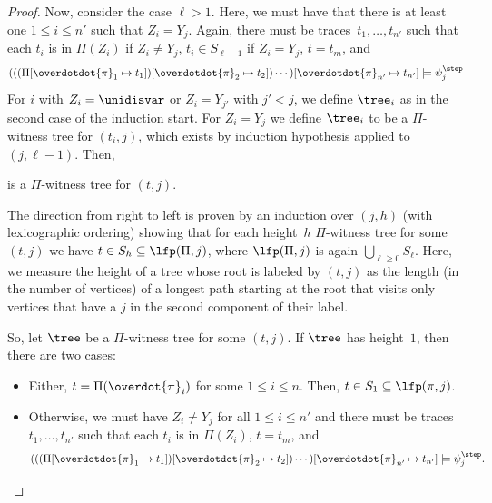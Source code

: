 \begin{proof}
Now, consider the case $\ell > 1$. Here, we must have that there is at least one $1 \le i \le n'$ such that $Z_i = Y_j$. Again, there must be traces~$t_1, \ldots, t_{n'}$ such that each $t_i$ is in $\Pi(Z_i)$ if $Z_i \neq Y_j$, $t_i \in S_{\ell-1}$ if $Z_i = Y_j$, $t = t_m$, and 
    \[
        (((\Pi[\overdotdot{\pi}_1 \mapsto t_1])[\overdotdot{\pi}_2 \mapsto t_2]) \cdots )[\overdotdot{\pi}_{n'} \mapsto t_{n'}]
    \models \psi_j^\step
    \]
For $i$ with $Z_i = \unidisvar$ or $Z_i = Y_{j'}$ with $j' < j$, we define $\tree_i$ as in the second case of the induction start. 
For $Z_i = Y_{j}$ we define $\tree_i$ to be a $\Pi$-witness tree for $(t_i,j)$, which exists by induction hypothesis applied to $(j, \ell-1)$.
Then,
\begin{center}
\end{center}
    is a $\Pi$-witness tree for $(t,j)$.

The direction from right to left is proven by an induction over $(j,h)$ (with lexicographic ordering) showing that for each height~$h$ $\Pi$-witness tree for some $(t,j)$ we have $t \in S_h \subseteq \lfp(\Pi, j)$, where $\lfp(\Pi,j)$ is again $\bigcup_{\ell \ge 0}S_\ell$.
Here, we measure the height of a tree whose root is labeled by $(t,j)$ as the length (in the number of vertices) of a longest path starting at the root that visits only vertices that have a $j$ in the second component of their label.

So, let $\tree$ be a $\Pi$-witness tree for some $(t,j)$.
If $\tree$ has height~$1$, then there are two cases:
\begin{itemize}
    \item Either, $t = \Pi(\overdot{\pi}_i)$ for some $1 \le i \le n$. Then, $t \in S_1 \subseteq \lfp(\pi,j)$.
    \item Otherwise, we must have $Z_i \neq Y_j$ for all $1 \le i \le n'$ and there must be traces~$t_1, \ldots, t_{n'}$ such that each $t_i$ is in $\Pi(Z_i)$, $t = t_m$, and 
    \[    (((\Pi[\overdotdot{\pi}_1 \mapsto t_1])[\overdotdot{\pi}_2 \mapsto t_2]) \cdots )[\overdotdot{\pi}_{n'} \mapsto t_{n'}]
    \models \psi_j^\step.\]
    

\end{itemize}
\end{proof}
